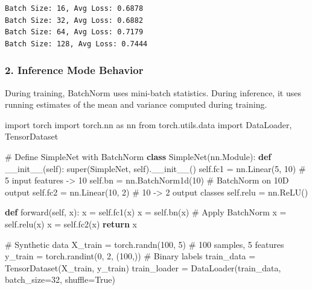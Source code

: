 \documentclass[
  letterpaper,
  DIV=11,
  numbers=noendperiod]{scrreprt}
\newenvironment{Shaded}{\begin{snugshade}}{\end{snugshade}}
\newcommand{\BuiltInTok}[1]{\textcolor[rgb]{0.00,0.23,0.31}{#1}}
\newcommand{\CommentTok}[1]{\textcolor[rgb]{0.37,0.37,0.37}{#1}}
\newcommand{\ControlFlowTok}[1]{\textcolor[rgb]{0.00,0.23,0.31}{\textbf{#1}}}
\newcommand{\DecValTok}[1]{\textcolor[rgb]{0.68,0.00,0.00}{#1}}
\newcommand{\FunctionTok}[1]{\textcolor[rgb]{0.28,0.35,0.67}{#1}}
\newcommand{\ImportTok}[1]{\textcolor[rgb]{0.00,0.46,0.62}{#1}}
\newcommand{\KeywordTok}[1]{\textcolor[rgb]{0.00,0.23,0.31}{\textbf{#1}}}
\newcommand{\NormalTok}[1]{\textcolor[rgb]{0.00,0.23,0.31}{#1}}
\newcommand{\OperatorTok}[1]{\textcolor[rgb]{0.37,0.37,0.37}{#1}}
\newcommand{\VariableTok}[1]{\textcolor[rgb]{0.07,0.07,0.07}{#1}}
\begin{document}
\begin{verbatim}
Batch Size: 16, Avg Loss: 0.6878
Batch Size: 32, Avg Loss: 0.6882
Batch Size: 64, Avg Loss: 0.7179
Batch Size: 128, Avg Loss: 0.7444
\end{verbatim}

\subsubsection{2. Inference Mode
Behavior}\label{inference-mode-behavior}

During training, BatchNorm uses mini-batch statistics. During inference,
it uses running estimates of the mean and variance computed during
training.

\begin{Shaded}
\begin{Highlighting}[]
\ImportTok{import}\NormalTok{ torch}
\ImportTok{import}\NormalTok{ torch.nn }\ImportTok{as}\NormalTok{ nn}
\ImportTok{from}\NormalTok{ torch.utils.data }\ImportTok{import}\NormalTok{ DataLoader, TensorDataset}

\CommentTok{\# Define SimpleNet with BatchNorm}
\KeywordTok{class}\NormalTok{ SimpleNet(nn.Module):}
    \KeywordTok{def} \FunctionTok{\_\_init\_\_}\NormalTok{(}\VariableTok{self}\NormalTok{):}
        \BuiltInTok{super}\NormalTok{(SimpleNet, }\VariableTok{self}\NormalTok{).}\FunctionTok{\_\_init\_\_}\NormalTok{()}
        \VariableTok{self}\NormalTok{.fc1 }\OperatorTok{=}\NormalTok{ nn.Linear(}\DecValTok{5}\NormalTok{, }\DecValTok{10}\NormalTok{)  }\CommentTok{\# 5 input features {-}\textgreater{} 10}
        \VariableTok{self}\NormalTok{.bn }\OperatorTok{=}\NormalTok{ nn.BatchNorm1d(}\DecValTok{10}\NormalTok{)  }\CommentTok{\# BatchNorm on 10D output}
        \VariableTok{self}\NormalTok{.fc2 }\OperatorTok{=}\NormalTok{ nn.Linear(}\DecValTok{10}\NormalTok{, }\DecValTok{2}\NormalTok{)  }\CommentTok{\# 10 {-}\textgreater{} 2 output classes}
        \VariableTok{self}\NormalTok{.relu }\OperatorTok{=}\NormalTok{ nn.ReLU()}

    \KeywordTok{def}\NormalTok{ forward(}\VariableTok{self}\NormalTok{, x):}
\NormalTok{        x }\OperatorTok{=} \VariableTok{self}\NormalTok{.fc1(x)}
\NormalTok{        x }\OperatorTok{=} \VariableTok{self}\NormalTok{.bn(x)  }\CommentTok{\# Apply BatchNorm}
\NormalTok{        x }\OperatorTok{=} \VariableTok{self}\NormalTok{.relu(x)}
\NormalTok{        x }\OperatorTok{=} \VariableTok{self}\NormalTok{.fc2(x)}
        \ControlFlowTok{return}\NormalTok{ x}

\CommentTok{\# Synthetic data}
\NormalTok{X\_train }\OperatorTok{=}\NormalTok{ torch.randn(}\DecValTok{100}\NormalTok{, }\DecValTok{5}\NormalTok{)  }\CommentTok{\# 100 samples, 5 features}
\NormalTok{y\_train }\OperatorTok{=}\NormalTok{ torch.randint(}\DecValTok{0}\NormalTok{, }\DecValTok{2}\NormalTok{, (}\DecValTok{100}\NormalTok{,))  }\CommentTok{\# Binary labels}
\NormalTok{train\_data }\OperatorTok{=}\NormalTok{ TensorDataset(X\_train, y\_train)}
\NormalTok{train\_loader }\OperatorTok{=}\NormalTok{ DataLoader(train\_data, batch\_size}\OperatorTok{=}\DecValTok{32}\NormalTok{, shuffle}\OperatorTok{=}\VariableTok{True}\NormalTok{)}


\end{Highlighting}
\end{Shaded}
\end{document}
